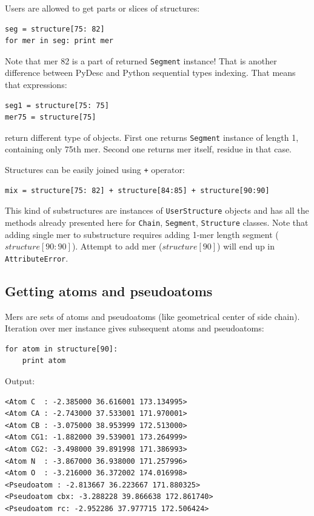 \documentclass{article}
\begin{document}
Users are allowed to get parts or slices of structures:

\begin{lstlisting}
seg = structure[75: 82]
for mer in seg: print mer
\end{lstlisting}

Note that mer 82 is a part of returned \texttt{Segment} instance! That is another difference between PyDesc and Python sequential types indexing. That means that expressions:

\begin{lstlisting}
seg1 = structure[75: 75]
mer75 = structure[75]
\end{lstlisting}

return different type of objects. First one returns \texttt{Segment} instance of length 1, containing only 75th mer. Second one returns mer itself, residue in that case.

Structures can be easily joined using \texttt{+} operator:

\begin{lstlisting}
mix = structure[75: 82] + structure[84:85] + structure[90:90]
\end{lstlisting}

This kind of substructures are instances of \texttt{UserStructure} objects and has all the methods already presented here for \texttt{Chain}, \texttt{Segment}, \texttt{Structure} classes. Note that adding single mer to substructure requires adding 1-mer length segment ($structure[90:90]$). Attempt to add mer ($structure[90]$) will end up in \texttt{AttributeError}.

%
%
%
\subsection{Getting atoms and pseudoatoms}

Mers are sets of atoms and pseudoatoms (like geometrical center of side chain). Iteration over mer instance gives subsequent atoms and pseudoatoms:

\begin{lstlisting}
for atom in structure[90]:
    print atom
\end{lstlisting}
Output:
\begin{lstlisting}
<Atom C  : -2.385000 36.616001 173.134995>
<Atom CA : -2.743000 37.533001 171.970001>
<Atom CB : -3.075000 38.953999 172.513000>
<Atom CG1: -1.882000 39.539001 173.264999>
<Atom CG2: -3.498000 39.891998 171.386993>
<Atom N  : -3.867000 36.938000 171.257996>
<Atom O  : -3.216000 36.372002 174.016998>
<Pseudoatom : -2.813667 36.223667 171.880325>
<Pseudoatom cbx: -3.288228 39.866638 172.861740>
<Pseudoatom rc: -2.952286 37.977715 172.506424>
\end{lstlisting}
\end{document}
